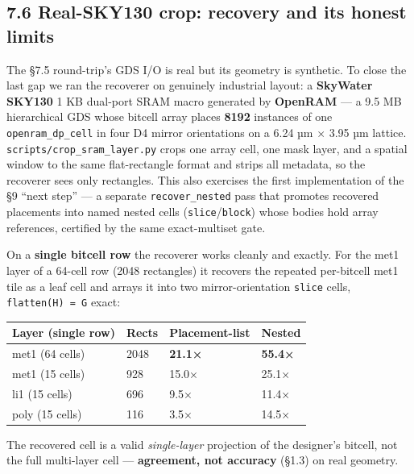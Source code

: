 \documentclass[
  11pt,
]{article}
\newcounter{none} %
\begin{document}
\subsection{7.6 Real-SKY130 crop: recovery and its honest
limits}\label{real-sky130-crop-recovery-and-its-honest-limits}

The §7.5 round-trip's GDS I/O is real but its geometry is synthetic. To
close the last gap we ran the recoverer on genuinely industrial layout:
a \textbf{SkyWater SKY130} 1 KB dual-port SRAM macro generated by
\textbf{OpenRAM} --- a 9.5 MB hierarchical GDS whose bitcell array
places \textbf{8192} instances of one \texttt{openram\_dp\_cell} in four
D4 mirror orientations on a 6.24 µm × 3.95 µm lattice.
\texttt{scripts/crop\_sram\_layer.py} crops one array cell, one mask
layer, and a spatial window to the same flat-rectangle format and strips
all metadata, so the recoverer sees only rectangles. This also exercises
the first implementation of the §9 ``next step'' --- a separate
\texttt{recover\_nested} pass that promotes recovered placements into
named nested cells (\texttt{slice}/\texttt{block}) whose bodies hold
array references, certified by the same exact-multiset gate.

On a \textbf{single bitcell row} the recoverer works cleanly and
exactly. For the met1 layer of a 64-cell row (2048 rectangles) it
recovers the repeated per-bitcell met1 tile as a leaf cell and arrays it
into two mirror-orientation \texttt{slice} cells,
\texttt{flatten(H)\ =\ G} exact:

{\def\LTcaptype{none} %
\begin{longtable}[]{@{}llll@{}}
\toprule\noalign{}
Layer (single row) & Rects & Placement-list & Nested \\
\midrule\noalign{}
\endhead
\bottomrule\noalign{}
\endlastfoot
met1 (64 cells) & 2048 & \textbf{21.1×} & \textbf{55.4×} \\
met1 (15 cells) & 928 & 15.0× & 25.1× \\
li1 (15 cells) & 696 & 9.5× & 11.4× \\
poly (15 cells) & 116 & 3.5× & 14.5× \\
\end{longtable}
}

The recovered cell is a valid \emph{single-layer} projection of the
designer's bitcell, not the full multi-layer cell --- \textbf{agreement,
not accuracy} (§1.3) on real geometry.
\end{document}
